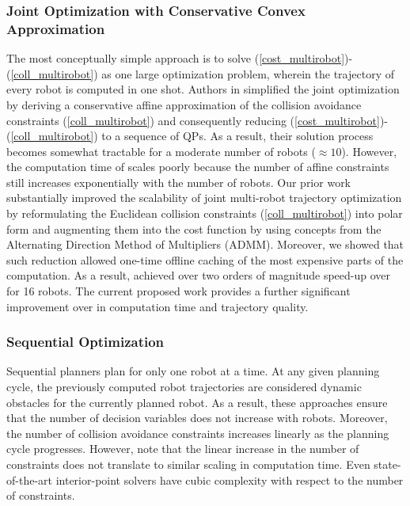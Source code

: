 \subsubsection{Joint Optimization with Conservative Convex Approximation}
\noindent The most conceptually simple approach is to solve (\ref{cost_multirobot})-(\ref{coll_multirobot}) as one large optimization problem, wherein the trajectory of every robot is computed in one shot. Authors in \citep{rafaella_scp} simplified the joint optimization by deriving a conservative affine approximation of the collision avoidance constraints (\ref{coll_multirobot}) and consequently reducing  (\ref{cost_multirobot})-(\ref{coll_multirobot}) to a sequence of QPs. As a result, their solution process becomes somewhat tractable for a moderate number of robots ($\approx 10$). However, the computation time of \citep{rafaella_scp} scales poorly because the number of affine constraints still increases exponentially with the number of robots. Our prior work \citep{aks_ral21} substantially improved the scalability of joint multi-robot trajectory optimization by reformulating the Euclidean collision constraints (\ref{coll_multirobot}) into polar form and augmenting them into the cost function by using concepts from the Alternating Direction Method of Multipliers (ADMM). Moreover, we showed that such reduction allowed one-time offline caching of the most expensive parts of the computation. As a result, \citep{aks_ral21} achieved over two orders of magnitude speed-up over \citep{rafaella_scp} for 16 robots. The current proposed work provides a further significant improvement over \citep{aks_ral21} in computation time and trajectory quality.

\subsubsection{Sequential Optimization}

Sequential planners plan for only one robot at a time. At any given planning cycle, the previously computed robot trajectories are considered dynamic obstacles for the currently planned robot. As a result, these approaches ensure that the number of decision variables does not increase with robots. Moreover, the number of collision avoidance constraints increases linearly as the planning cycle progresses. However, note that the linear increase in the number of constraints does not translate to similar scaling in computation time. Even state-of-the-art interior-point solvers have cubic complexity with respect to the number of constraints.

